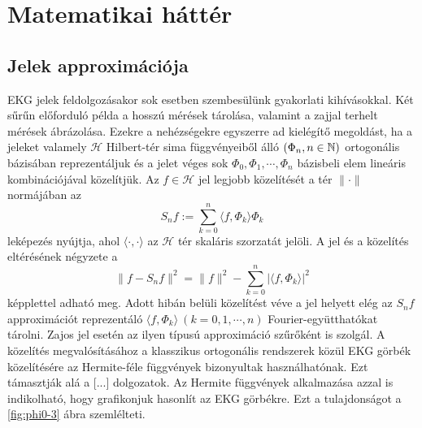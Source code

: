 \documentclass[oneside,titlepage,12pt,a4paper]{report}
\begin{document}
\section{Matematikai háttér}
\subsection{Jelek approximációja}

EKG jelek feldolgozásakor sok esetben szembesülünk gyakorlati kihívásokkal. Két sűrűn előforduló példa a hosszú mérések tárolása, valamint a zajjal terhelt mérések ábrázolása. Ezekre a nehézségekre egyszerre ad kielégítő megoldást, ha a jeleket  valamely $\mathcal H$ Hilbert-tér sima függvényeiből álló $(\Phi_n, n\in\Bbb N)$ ortogonális bázisában reprezentáljuk és a jelet véges sok $\Phi_0,\Phi_1,\cdots,\Phi_n$ bázisbeli elem lineáris kombinációjával közelítjük. Az $f\in\mathcal H$ jel
legjobb közelítését a tér $\|\cdot\|$ normájában az
$$
S_nf:=\sum_{k=0}^n\langle f,\Phi_k\rangle \Phi_k
$$
leképezés nyújtja, ahol $\langle\cdot,\cdot\rangle$ az $\mathcal  H$ tér
skaláris szorzatát jelöli. A jel és a közelítés eltérésének négyzete  a
$$
\|f-S_nf\|^2=\|f\|^2-\sum_{k=0}^n|\langle f,\Phi_k\rangle|^2
$$
képplettel adható meg. Adott hibán belüli közelítést véve a jel helyett  elég az
$S_nf$ approximációt reprezentáló  $\langle f,\Phi_k\rangle\ (k=0,1,\cdots, n)$ Fourier-együtthatókat tárolni.  Zajos jel esetén az ilyen típusú approximáció szűrőként is szolgál.  A közelítés megvalósításához a klasszikus ortogonális rendszerek közül  EKG görbék közelítésére  az Hermite-féle függvények bizonyultak használhatónak. Ezt támasztják alá a [...] dolgozatok. Az  Hermite függvények alkalmazása azzal is indikolható, hogy grafikonjuk hasonlít az EKG görbékre. Ezt a tulajdonságot a \ref{fig:phi0-3} ábra szemlélteti.

\end{document}
